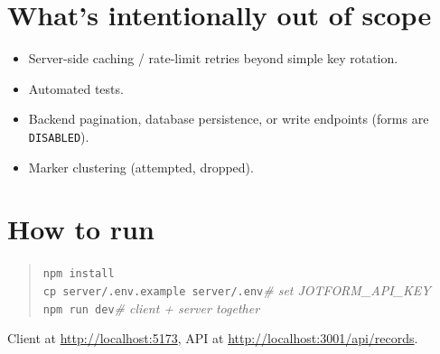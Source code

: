 \documentclass[11pt,a4paper]{article}
\newcommand{\code}[1]{\texttt{\small #1}}
\begin{document}
\section{What's intentionally out of scope}

\begin{itemize}
  \item Server-side caching / rate-limit retries beyond simple key rotation.
  \item Automated tests.
  \item Backend pagination, database persistence, or write endpoints (forms are \code{DISABLED}).
  \item Marker clustering (attempted, dropped).
\end{itemize}

\section{How to run}

\begin{quote}
\code{npm install} \\
\code{cp server/.env.example server/.env}\quad\textit{\# set JOTFORM\_API\_KEY} \\
\code{npm run dev}\quad\textit{\# client + server together}
\end{quote}

Client at \url{http://localhost:5173}, API at \url{http://localhost:3001/api/records}.
\end{document}
